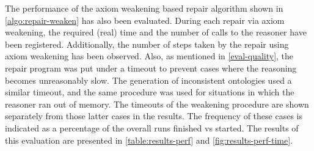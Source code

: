 
The performance of the axiom weakening based repair algorithm shown in \cref{algo:repair-weaken} has also been evaluated. During each repair via axiom weakening, the required (real) time and the number of calls to the reasoner have been registered. Additionally, the number of steps taken by the repair using axiom weakening has been observed. Also, as mentioned in \cref{eval-quality}, the repair program was put under a timeout to prevent cases where the reasoning becomes unreasonably slow. The generation of inconsistent ontologies used a similar timeout, and the same procedure was used for situations in which the reasoner ran out of memory. The timeouts of the weakening procedure are shown separately from those latter cases in the results. The frequency of these cases is indicated as a percentage of the overall runs finished vs started. The results of this evaluation are presented in \cref{table:results-perf} and \cref{fig:results-perf-time}.


